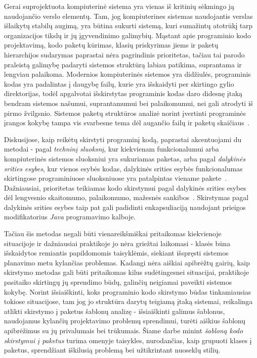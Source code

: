 Gerai suprojektuota kompiuterinė sistema yra vienas iš kritinių sėkmingo ją naudojančio verslo
elementų.
Tam, jog kompiuterines sistemas naudojantis verslas išlaikytų stabilų augimą, yra būtina sukurti sistemą, kuri sumažintų
atotrūkį tarp organizacijos tikslų ir jų įgyvendinimo galimybių.
Mąstant apie programinio kodo
projektavimą, kodo paketų kūrimas, klasių priskyrimas jiems ir paketų hierarchijos sudarymas paprastai
nėra pagrindinis prioritetas, tačiau tai parodo praleistą galimybę padaryti sistemos struktūrą labiau
patikima, suprantama ir lengviau palaikoma.
Modernios kompiuterinės sistemos yra didžiulės, programinis kodas yra padalintas į daugybę failų,
kurie yra išskaidyti per skirtingo gylio direktorijas, todėl apgalvotai išskirstytas programinis
kodas daro didesnę įtaką bendram sistemos našumui, suprantamumui bei palaikomumui, nei gali atrodyti iš pirmo žvilgsnio.
Sistemos paketų struktūros analizė norint įvertinti programinės įrangos kokybę
tampa vis svarbesne tema dėl augančio failų ir paketų skaičiaus~\cite{DesignMetrics}.

Diskusijose, kaip reikėtų skirstyti programinį kodą, paprastai akcentuojami du metodai - pagal \textit{techninį sluoksnį},
kur kiekvienam funkcionalumui arba kompiuterinės sistemos sluoksniui yra sukuriamas paketas,
arba pagal \textit{dalykinės srities esybes}, kur vienos esybės kodas, dalykinės srities
esybės funkcionalumas skirtingose programiniuose sluoksniuose yra patalpintas viename pakete~\cite{PackagingWays}.
Dažniausiai, prioritetas teikiamas kodo skirstymui pagal dalykinės srities esybes~\cite{DomainDrivenDesign} dėl lengvesnio skaitomumo,
palaikomumo, mažesnės sankibos~\cite{DivideByDomain}.
Skirstymas pagal dalykinės srities esybes taip pat gali padidinti
enkapsuliaciją naudojant prieigos modifikatorius \textit{Java} programavimo kalboje.

Tačiau šis metodas negali būti vienareikšmiškai pritaikomas kiekvienoje situacijoje ir dažniausiai praktikoje jo nėra griežtai laikomasi -
klasės būna išskaidytos remiantis papildomomis taisyklėmis,
siekiant išspręsti sistemos planavimo metu kylančias problemas.
Kadangi nėra aiškiai apibrėžtų gairių, kaip skirstymo metodas gali būti pritaikomas kilus sudėtingesnei situacijai, praktikoje pasitaiko skirtingų
jų sprendimo būdų, galinčių neigiamai paveikti sistemos kokybę.
Norint išsiaiškinti, koks programinio kodo skirstymo būdas tinkamiausias tokiose situacijose,
tam jog jo struktūra darytų teigiamą įtaką sistemai, reikalinga atlikti skirstymo į paketus šablonų analizę -
išsiaiškinti galimus šablonus, naudojamus kylančių projektavimo problemų sprendimui, turėti aiškius šablonų apibrėžimus su jų
privalumais bei trūkumais.
Šiame darbe minint \textit{šabloną kodo skirstymui į paketus} turima omenyje taisykles,
nurodančias, kaip grupuoti klases į paketus, sprendžiant iškilusią problemą bei užtikrintant nuoseklų stilių.

